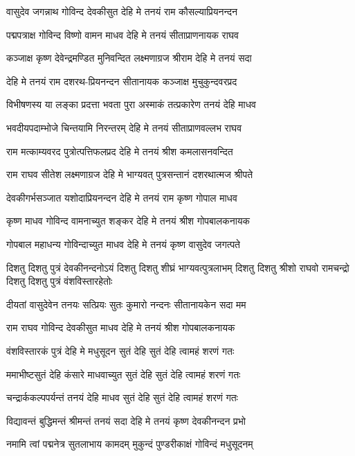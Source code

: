 \twolineshloka
{वासुदेव जगन्नाथ गोविन्द देवकीसुत}
{देहि मे तनयं राम कौसल्याप्रियनन्दन}%

\twolineshloka
{पद्मपत्राक्ष गोविन्द विष्णो वामन माधव}
{देहि मे तनयं सीताप्राणनायक राघव}%

\twolineshloka
{कञ्जाक्ष कृष्ण देवेन्द्रमण्डित मुनिवन्दित}
{लक्ष्मणाग्रज श्रीराम देहि मे तनयं सदा}%

\twolineshloka
{देहि मे तनयं राम दशरथ-प्रियनन्दन}
{सीतानायक कञ्जाक्ष मुचुकुन्दवरप्रद}%

\twolineshloka
{विभीषणस्य या लङ्का प्रदत्ता भवता पुरा}
{अस्माकं तत्प्रकारेण तनयं देहि माधव}%

\twolineshloka
{भवदीयपदाम्भोजे चिन्तयामि निरन्तरम्}
{देहि मे तनयं सीताप्राणवल्लभ राघव}%

\twolineshloka
{राम मत्काम्यवरद पुत्रोत्पत्तिफलप्रद}
{देहि मे तनयं श्रीश कमलासनवन्दित}%

\twolineshloka
{राम राघव सीतेश लक्ष्मणाग्रज देहि मे}
{भाग्यवत् पुत्रसन्तानं दशरथात्मज श्रीपते}%

\twolineshloka
{देवकीगर्भसञ्जात यशोदाप्रियनन्दन}
{देहि मे तनयं राम कृष्ण गोपाल माधव}%

\twolineshloka
{कृष्ण माधव गोविन्द वामनाच्युत शङ्कर}
{देहि मे तनयं श्रीश गोपबालकनायक}%

\twolineshloka
{गोपबाल महाधन्य गोविन्दाच्युत माधव}
{देहि मे तनयं कृष्ण वासुदेव जगत्पते}%

\fourlineindentedshloka
{दिशतु दिशतु पुत्रं देवकीनन्दनोऽयं}
{दिशतु दिशतु शीघ्रं भाग्यवत्पुत्रलाभम्}
{दिशतु दिशतु श्रीशो राघवो रामचन्द्रो}
{दिशतु दिशतु पुत्रं वंशविस्तारहेतोः}%

\twolineshloka
{दीयतां वासुदेवेन तनयः सत्प्रियः सुतः}
{कुमारो नन्दनः सीतानायकेन सदा मम}%

\twolineshloka
{राम राघव गोविन्द देवकीसुत माधव}
{देहि मे तनयं श्रीश गोपबालकनायक}%

\twolineshloka
{वंशविस्तारकं पुत्रं देहि मे मधुसूदन}
{सुतं देहि सुतं देहि त्वामहं शरणं गतः}%

\twolineshloka
{ममाभीष्टसुतं देहि कंसारे माधवाच्युत}
{सुतं देहि सुतं देहि त्वामहं शरणं गतः}%

\twolineshloka
{चन्द्रार्ककल्पपर्यन्तं तनयं देहि माधव}
{सुतं देहि सुतं देहि त्वामहं शरणं गतः}%

\twolineshloka
{विद्यावन्तं बुद्धिमन्तं श्रीमन्तं तनयं सदा}
{देहि मे तनयं कृष्ण देवकीनन्दन प्रभो}%

\twolineshloka
{नमामि त्वां पद्मनेत्र सुतलाभाय कामदम्}
{मुकुन्दं पुण्डरीकाक्षं गोविन्दं मधुसूदनम्}%

